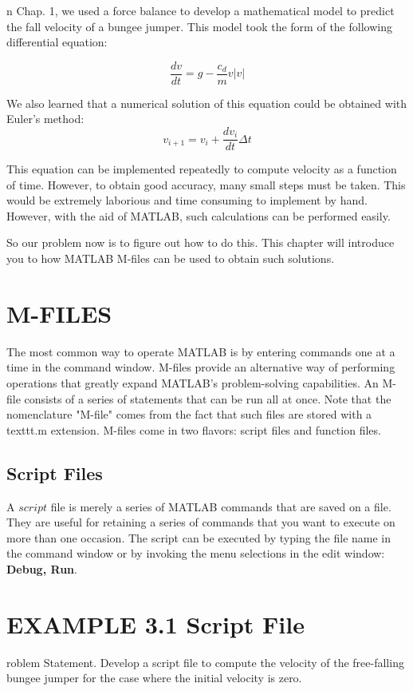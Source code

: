 \documentclass[../main.tex]{subfiles}
\begin{document}
n Chap. 1, we used a force balance to develop a mathematical model to predict the
fall velocity of a bungee jumper. This model took the form of the following differential
equation:

$$\dfrac{dv}{dt}=g-\dfrac{c_d}{m}v|v| $$

We also learned that a numerical solution of this equation could be obtained with Euler's
method:
$$v_{i+1} = v_i +\dfrac{dv_i}{dt}\Delta t$$

This equation can be implemented repeatedly to compute velocity as a function of
time. However, to obtain good accuracy, many small steps must be taken. This would be
extremely laborious and time consuming to implement by hand. However, with the aid of
MATLAB, such calculations can be performed easily.

So our problem now is to figure out how to do this. This chapter will introduce you to
how MATLAB M-files can be used to obtain such solutions.

\section{M-FILES}

The most common way to operate MATLAB is by entering commands one at a time in the
command window. M-files provide an alternative way of performing operations that
greatly expand MATLAB's problem-solving capabilities. An M-file consists of a series of
statements that can be run all at once. Note that the nomenclature "M-file" comes from the
fact that such files are stored with a texttt{.m} extension. M-files come in two flavors: script files
and function files.

\subsection{ Script Files}

A $script$ file is merely a series of MATLAB commands that are saved on a file. They are
useful for retaining a series of commands that you want to execute on more than one occasion. The 
script can be executed by typing the file name in the command window or by
invoking the menu selections in the edit window: \textbf{Debug, Run}.

\section*{EXAMPLE 3.1 Script File}

roblem Statement. Develop a script file to compute the velocity of the free-falling
bungee jumper for the case where the initial velocity is zero.
\end{document}
